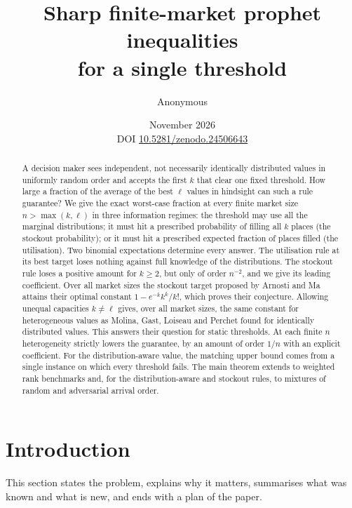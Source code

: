 \documentclass[11pt,a4paper]{article}
\title{\color{ink}\bfseries Sharp finite-market prophet inequalities\\for a single threshold}
\author{Anonymous}
\date{November 2026\\[2pt]\small DOI \href{https://doi.org/10.5281/zenodo.24506643}{10.5281/zenodo.24506643}}
\theoremstyle{remark}
\begin{document}
\maketitle
\begin{abstract}
A decision maker sees independent, not necessarily identically distributed values in uniformly random order and accepts the first $k$ that clear one fixed threshold. How large a fraction of the average of the best $\ell$ values in hindsight can such a rule guarantee? We give the exact worst-case fraction at every finite market size $n>\max(k,\ell)$ in three information regimes: the threshold may use all the marginal distributions; it must hit a prescribed probability of filling all $k$ places (the stockout probability); or it must hit a prescribed expected fraction of places filled (the utilisation). Two binomial expectations determine every answer. The utilisation rule at its best target loses nothing against full knowledge of the distributions. The stockout rule loses a positive amount for $k\ge2$, but only of order $n^{-2}$, and we give its leading coefficient. Over all market sizes the stockout target proposed by Arnosti and Ma attains their optimal constant $1-e^{-k}k^k/k!$, which proves their conjecture. Allowing unequal capacities $k\neq\ell$ gives, over all market sizes, the same constant for heterogeneous values as Molina, Gast, Loiseau and Perchet found for identically distributed values. This answers their question for static thresholds. At each finite $n$ heterogeneity strictly lowers the guarantee, by an amount of order $1/n$ with an explicit coefficient. For the distribution-aware value, the matching upper bound comes from a single instance on which every threshold fails. The main theorem extends to weighted rank benchmarks and, for the distribution-aware and stockout rules, to mixtures of random and adversarial arrival order.
\end{abstract}

\section{Introduction}
This section states the problem, explains why it matters, summarises what was known and what is new, and ends with a plan of the paper.
\end{document}
